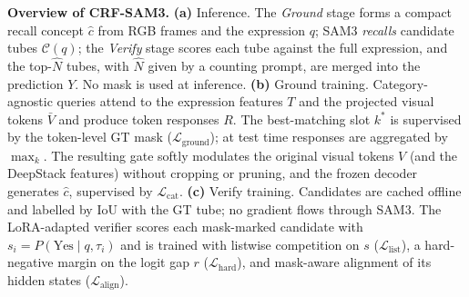 \caption{\textbf{Overview of CRF-SAM3.}
\textbf{(a)} Inference. The \emph{Ground} stage forms a compact recall concept $\hat c$ from RGB frames and the expression $q$; SAM3 \emph{recalls} candidate tubes $\mathcal{C}(q)$; the \emph{Verify} stage scores each tube against the full expression, and the top-$\hat N$ tubes, with $\hat N$ given by a counting prompt, are merged into the prediction $Y$. No mask is used at inference.
\textbf{(b)} Ground training. Category-agnostic queries attend to the expression features $T$ and the projected visual tokens $\bar V$ and produce token responses $R$. The best-matching slot $k^{*}$ is supervised by the token-level GT mask ($\mathcal{L}_{\mathrm{ground}}$); at test time responses are aggregated by $\max_k$. The resulting gate softly modulates the original visual tokens $V$ (and the DeepStack features) without cropping or pruning, and the frozen decoder generates $\hat c$, supervised by $\mathcal{L}_{\mathrm{cat}}$.
\textbf{(c)} Verify training. Candidates are cached offline and labelled by IoU with the GT tube; no gradient flows through SAM3. The LoRA-adapted verifier scores each mask-marked candidate with $s_i=P(\mathrm{Yes}\mid q,\tau_i)$ and is trained with listwise competition on $s$ ($\mathcal{L}_{\mathrm{list}}$), a hard-negative margin on the logit gap $r$ ($\mathcal{L}_{\mathrm{hard}}$), and mask-aware alignment of its hidden states ($\mathcal{L}_{\mathrm{align}}$).}
